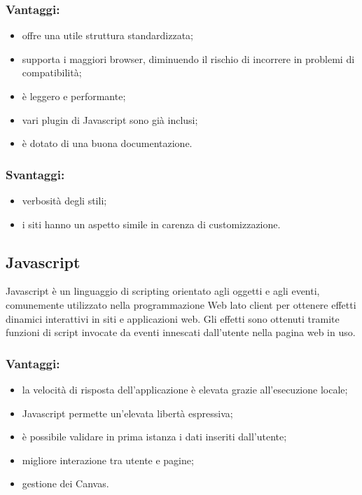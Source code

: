 \documentclass[a4paper, titlepage]{article}
\begin{document}
\subsubsection{Vantaggi:}

\begin{itemize}
	\item offre una utile struttura standardizzata;
	\item supporta i maggiori browser, diminuendo il rischio di incorrere in problemi di compatibilità;
	\item è leggero e performante;
	\item vari plugin di Javascript sono già inclusi;
	\item è dotato di una buona documentazione.
\end{itemize}

\subsubsection{Svantaggi:}

\begin{itemize}
	\item verbosità degli stili;
	\item i siti hanno un aspetto simile in carenza di customizzazione.
\end{itemize}

\subsection{Javascript}
Javascript è un linguaggio di scripting orientato agli oggetti e agli eventi, comunemente utilizzato nella programmazione Web lato client per ottenere effetti dinamici interattivi in siti e applicazioni web. Gli effetti sono ottenuti tramite funzioni di script invocate da eventi innescati dall'utente nella pagina web in uso.

\subsubsection{Vantaggi:}

\begin{itemize}
	\item la velocità di risposta dell'applicazione è elevata grazie all'esecuzione locale;
	\item Javascript permette un'elevata libertà espressiva;
	\item è possibile validare in prima istanza i dati inseriti dall'utente;
	\item migliore interazione tra utente e pagine;
	\item gestione dei Canvas.
\end{itemize}
\end{document}
